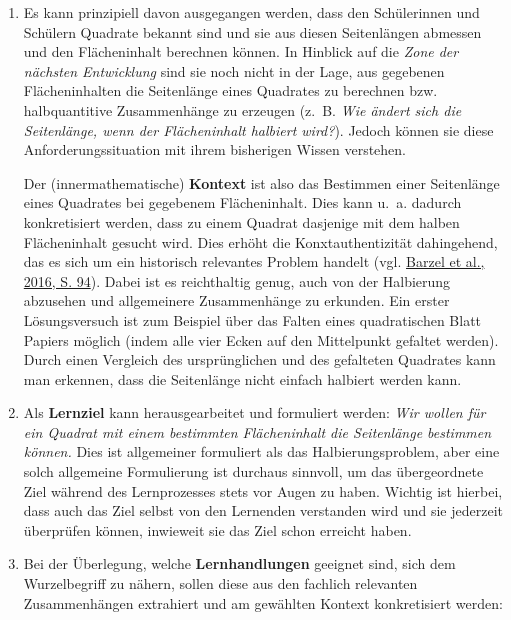 \documentclass[
]{scrbook}
\theoremstyle{definition}
\theoremstyle{definition}
\theoremstyle{definition}
\theoremstyle{definition}
\theoremstyle{remark}
\begin{document}
\begin{enumerate}
\def\labelenumi{\arabic{enumi}.}
\item
  Es kann prinzipiell davon ausgegangen werden, dass den Schülerinnen und Schülern Quadrate bekannt sind und sie aus diesen Seitenlängen abmessen und den Flächeninhalt berechnen können. In Hinblick auf die \emph{Zone der nächsten Entwicklung} sind sie noch nicht in der Lage, aus gegebenen Flächeninhalten die Seitenlänge eines Quadrates zu berechnen bzw. halbquantitive Zusammenhänge zu erzeugen (z.~B. \emph{Wie ändert sich die Seitenlänge, wenn der Flächeninhalt halbiert wird?}). Jedoch können sie diese Anforderungssituation mit ihrem bisherigen Wissen verstehen.

  Der (innermathematische) \textbf{Kontext} ist also das Bestimmen einer Seitenlänge eines Quadrates bei gegebenem Flächeninhalt. Dies kann u.~a. dadurch konkretisiert werden, dass zu einem Quadrat dasjenige mit dem halben Flächeninhalt gesucht wird. Dies erhöht die Konxtauthentizität dahingehend, das es sich um ein historisch relevantes Problem handelt (vgl. \protect\hyperlink{ref-Barzel2016}{Barzel et al., 2016, S. 94}). Dabei ist es reichthaltig genug, auch von der Halbierung abzusehen und allgemeinere Zusammenhänge zu erkunden. Ein erster Lösungsversuch ist zum Beispiel über das Falten eines quadratischen Blatt Papiers möglich (indem alle vier Ecken auf den Mittelpunkt gefaltet werden). Durch einen Vergleich des ursprünglichen und des gefalteten Quadrates kann man erkennen, dass die Seitenlänge nicht einfach halbiert werden kann.
\item
  Als \textbf{Lernziel} kann herausgearbeitet und formuliert werden: \emph{Wir wollen für ein Quadrat mit einem bestimmten Flächeninhalt die Seitenlänge bestimmen können.} Dies ist allgemeiner formuliert als das Halbierungsproblem, aber eine solch allgemeine Formulierung ist durchaus sinnvoll, um das übergeordnete Ziel während des Lernprozesses stets vor Augen zu haben. Wichtig ist hierbei, dass auch das Ziel selbst von den Lernenden verstanden wird und sie jederzeit überprüfen können, inwieweit sie das Ziel schon erreicht haben.
\item
  Bei der Überlegung, welche \textbf{Lernhandlungen} geeignet sind, sich dem Wurzelbegriff zu nähern, sollen diese aus den fachlich relevanten Zusammenhängen extrahiert und am gewählten Kontext konkretisiert werden:


\end{enumerate}
\end{document}
